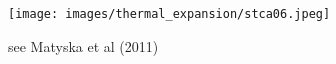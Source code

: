 

\texttt{[image: images/thermal\_expansion/stca06.jpeg]}

see Matyska et al (2011) \cite{mayw11}


